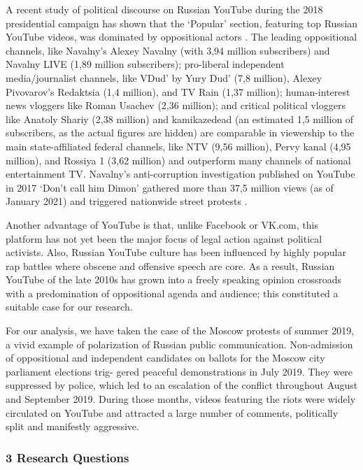A recent study of political discourse on Russian YouTube during the 2018 presidential campaign has shown that the ‘Popular’ section, featuring top Russian YouTube videos, was dominated by oppositional actors \cite{Litvinenko2018}. The leading oppositional channels, like Navalny’s Alexey Navalny (with 3,94 million subscribers) and Navalny LIVE (1,89 million subscribers); pro-liberal independent media/journalist channels, like VDud’ by Yury Dud’ (7,8 million), Alexey Pivovarov’s Redaktsia (1,4 million), and TV Rain (1,37 million); human-interest news vloggers like Roman Usachev (2,36 million); and critical political vloggers like Anatoly Shariy (2,38 million) and kamikazedead (an estimated 1,5 million of subscribers, as the actual figures are hidden) are comparable in viewership to the main state-affiliated federal channels, like NTV (9,56 million), Pervy kanal (4,95 million), and Rossiya 1 (3,62 million) and outperform many channels of national entertainment TV. Navalny’s anti-corruption investigation published on YouTube in 2017 ‘Don’t call him Dimon’ \cite{Navalny} gathered more than 37,5 million views (as of January 2021) and triggered nationwide street protests \cite{Gorbachev}.

Another advantage of YouTube is that, unlike Facebook or VK.com, this platform has not yet been the major focus of legal action against political activists. Also, Russian YouTube culture has been influenced by highly popular rap battles where obscene and offensive speech are core. As a result, Russian YouTube of the late 2010s has grown into a freely speaking opinion crossroads with a predomination of oppositional agenda and audience; this constituted a suitable case for our research.

For our analysis, we have taken the case of the Moscow protests of summer 2019, a vivid example of polarization of Russian public communication. Non-admission of oppositional and independent candidates on ballots for the Moscow city parliament elections trig- gered peaceful demonstrations in July 2019. They were suppressed by police, which led to an escalation of the conflict throughout August and September 2019. During those months, videos featuring the riots were widely circulated on YouTube and attracted a large number of comments, politically split and manifestly aggressive.

\subsubsection{3 Research Questions}

